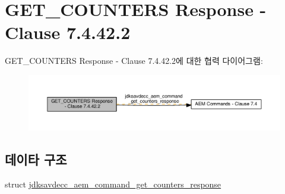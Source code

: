 \hypertarget{group__command__get__counters__response}{}\section{G\+E\+T\+\_\+\+C\+O\+U\+N\+T\+E\+RS Response -\/ Clause 7.4.42.2}
\label{group__command__get__counters__response}
G\+E\+T\+\_\+\+C\+O\+U\+N\+T\+E\+RS Response -\/ Clause 7.4.42.2에 대한 협력 다이어그램\+:
\nopagebreak
\begin{figure}[H]
\begin{center}
\leavevmode
\includegraphics[width=350pt]{group__command__get__counters__response}
\end{center}
\end{figure}
\subsection*{데이타 구조}
\begin{DoxyCompactItemize}
\item 
struct \hyperlink{structjdksavdecc__aem__command__get__counters__response}{jdksavdecc\+\_\+aem\+\_\+command\+\_\+get\+\_\+counters\+\_\+response}
\end{DoxyCompactItemize}
